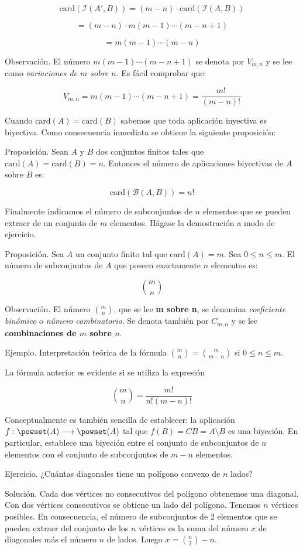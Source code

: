 $$ \text{card} \left( \mathcal{I}(A', B) \right) = (m-n) \cdot \text{card}
\left( \mathcal{I}(A, B) \right) $$

$$ = (m-n) \cdot m(m-1)\cdots(m-n+1) $$

$$ = m(m-1)\cdots(m-n) $$

Observación. El número $m(m-1)\cdots(m-n+1)$ se denota por $V_{m,n}$ y se
lee como \emph{variaciones de $m$ sobre $n$}. Es fácil comprobar que:

$$ V_{m,n} = m(m-1)\cdots(m-n+1) = \frac{m!}{(m-n)!} $$

Cuando $\text{card}(A) = \text{card}(B)$ sabemos que toda aplicación
inyectiva es biyectiva. Como consecuencia inmediata se obtiene la siguiente
proposición:

Proposición. Sean $A$ y $B$ dos conjuntos finitos tales que $\text{card}(A)
= \text{card}(B) = n$. Entonces el número de aplicaciones biyectivas de $A$
sobre $B$ es:

$$ \text{card} \left( \mathcal{B}(A, B) \right) = n! $$

Finalmente indicamos el número de subconjuntos de $n$ elementos que se
pueden extraer de un conjunto de $m$ elementos. Hágase la demostración a
modo de ejercicio.

Proposición. Sea $A$ un conjunto finito tal que $\text{card}(A) = m$. Sea $0
\leq n \leq m$. El número de subconjuntos de $A$ que poseen exactamente $n$
elementos es:

$$ \binom{m}{n} $$

Observación. El número $\binom{m}{n}$, que se lee \textbf{m sobre n}, se
denomina \emph{coeficiente binómico} o \emph{número combinatorio}. Se denota
también por $C_{m,n}$ y se lee \textbf{combinaciones de $m$ sobre $n$}.

Ejemplo. Interpretación teórica de la fórmula \quad $\binom{m}{n} =
\binom{m}{m-n}$ \quad si \quad $0 \leq n \leq m$.

La fórmula anterior es evidente si se utiliza la expresión

$$ \binom{m}{n} = \frac{m!}{n!(m-n)!} $$

Conceptualmente es también sencilla de establecer: la aplicación $f:
\powset(A) \longrightarrow \powset(A)$ tal que $f(B) = CB = A \setminus B$
es una biyeción. En particular, establece una biyeción entre el conjunto de
subconjuntos de $n$ elementos con el conjunto de subconjuntos de $m-n$
elementos.

Ejercicio. ¿Cuántas diagonales tiene un polígono convexo de $n$ lados?

Solución. Cada dos vértices no consecutivos del polígono obtenemos una
diagonal. Con dos vértices consecutivos se obtiene un lado del polígono.
Tenemos $n$ vértices posibles. En consecuencia, el número de subconjuntos de
2 elementos que se pueden extraer del conjunto de los $n$ vértices es la
suma del número $x$ de diagonales más el número $n$ de lados. Luego $x =
\binom{n}{2} - n$.














